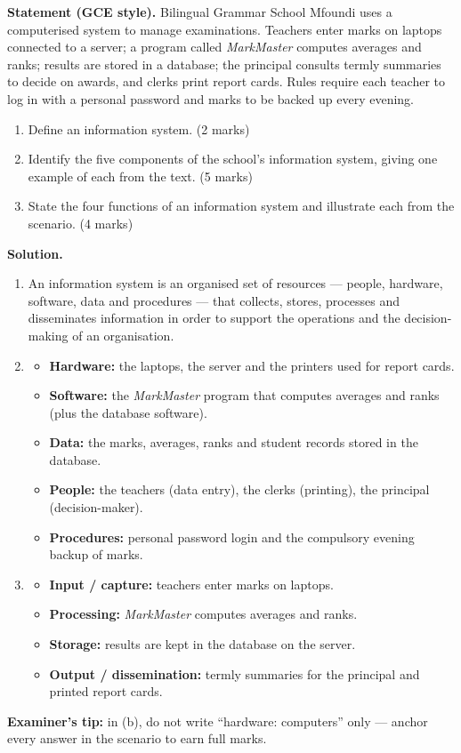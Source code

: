 \documentclass[11pt]{article}
\begin{document}
\begin{exoresolu}
\textbf{Statement (GCE style).} Bilingual Grammar School Mfoundi uses a computerised system to manage examinations. Teachers enter marks on laptops connected to a server; a program called \emph{MarkMaster} computes averages and ranks; results are stored in a database; the principal consults termly summaries to decide on awards, and clerks print report cards. Rules require each teacher to log in with a personal password and marks to be backed up every evening.
\begin{enumerate}
\item[a)] Define an information system. \hfill (2 marks)
\item[b)] Identify the five components of the school's information system, giving one example of each from the text. \hfill (5 marks)
\item[c)] State the four functions of an information system and illustrate each from the scenario. \hfill (4 marks)
\end{enumerate}
\tcblower
\textbf{Solution.}
\begin{enumerate}
\item[a)] An information system is an organised set of resources — people, hardware, software, data and procedures — that collects, stores, processes and disseminates information in order to support the operations and the decision-making of an organisation.
\item[b)]
\begin{itemize}
\item \textbf{Hardware:} the laptops, the server and the printers used for report cards.
\item \textbf{Software:} the \emph{MarkMaster} program that computes averages and ranks (plus the database software).
\item \textbf{Data:} the marks, averages, ranks and student records stored in the database.
\item \textbf{People:} the teachers (data entry), the clerks (printing), the principal (decision-maker).
\item \textbf{Procedures:} personal password login and the compulsory evening backup of marks.
\end{itemize}
\item[c)]
\begin{itemize}
\item \textbf{Input / capture:} teachers enter marks on laptops.
\item \textbf{Processing:} \emph{MarkMaster} computes averages and ranks.
\item \textbf{Storage:} results are kept in the database on the server.
\item \textbf{Output / dissemination:} termly summaries for the principal and printed report cards.
\end{itemize}
\end{enumerate}
\textbf{Examiner's tip:} in (b), do not write ``hardware: computers'' only — anchor every answer in the scenario to earn full marks.
\end{exoresolu}
\end{document}
